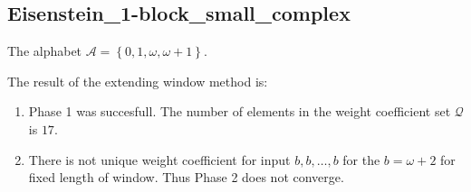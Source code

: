 \subsection{ Eisenstein\_1-block\_small\_complex }

\label{subsec:Eisenstein1-blocksmallcomplex}

The alphabet $\mathcal{A} =\left\{0, 1, \omega, \omega + 1\right\}$.

\noindent The result of the extending window method is:
\begin{enumerate}
    \item Phase 1 was succesfull.
The number of elements in the weight coefficient set $\mathcal{Q}$ is $17$.

    \item There is not unique weight coefficient for input $b,b,\dots,b$ for the $b= \omega + 2 $ for fixed length of window. Thus Phase 2 does not converge.

\end{enumerate}
